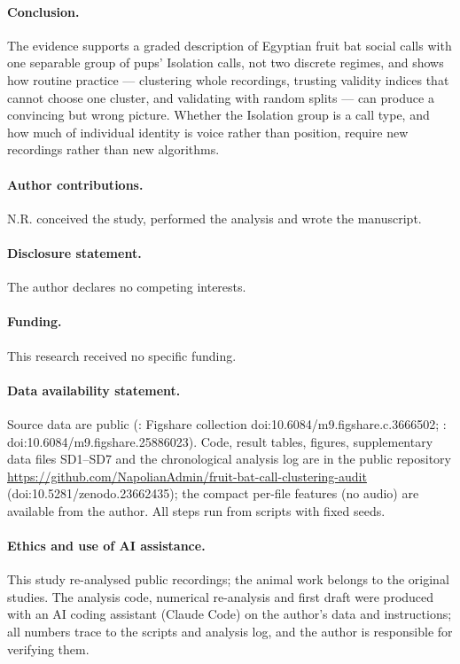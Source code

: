 \paragraph{Conclusion.} The evidence supports a graded description of Egyptian fruit bat social calls with one separable group of pups' Isolation calls, not two discrete regimes, and shows how routine practice --- clustering whole recordings, trusting validity indices that cannot choose one cluster, and validating with random splits --- can produce a convincing but wrong picture. Whether the Isolation group is a call type, and how much of individual identity is voice rather than position, require new recordings rather than new algorithms.

\sloppy \paragraph*{Author contributions.} N.R. conceived the study, performed the analysis and wrote the manuscript.

\paragraph*{Disclosure statement.} The author declares no competing interests.

\paragraph*{Funding.} This research received no specific funding.

\paragraph*{Data availability statement.} Source data are public (\citet{prat2017}: Figshare collection doi:10.6084/m9.figshare.c.3666502; \citet{elie2024}: doi:10.6084/m9.figshare.25886023). Code, result tables, figures, supplementary data files SD1--SD7 and the chronological analysis log are in the public repository \url{https://github.com/NapolianAdmin/fruit-bat-call-clustering-audit} (doi:10.5281/zenodo.23662435); the compact per-file features (no audio) are available from the author. All steps run from scripts with fixed seeds.

\paragraph*{Ethics and use of AI assistance.} This study re-analysed public recordings; the animal work belongs to the original studies. The analysis code, numerical re-analysis and first draft were produced with an AI coding assistant (Claude Code) on the author's data and instructions; all numbers trace to the scripts and analysis log, and the author is responsible for verifying them.
